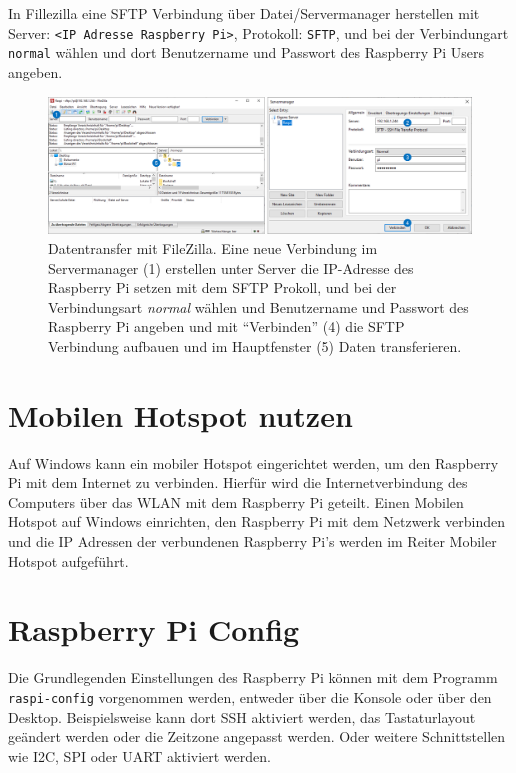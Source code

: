 \documentclass[
  11pt,
  a4paper,
  oneside, openany  ,captions=tableheading
]{scrbook}
\theoremstyle{remark}
\begin{document}
In Fillezilla eine SFTP Verbindung über Datei/Servermanager herstellen
mit Server:
\texttt{\textless{}IP\ Adresse\ Raspberry\ Pi\textgreater{}}, Protokoll:
\texttt{SFTP}, und bei der Verbindungart \texttt{normal} wählen und dort
Benutzername und Passwort des Raspberry Pi Users angeben.

\begin{figure}[H]

{\centering \includegraphics{images/raspberry_pi_filezilla.png}

}

\caption{Datentransfer mit FileZilla. Eine neue Verbindung im
Servermanager (1) erstellen unter Server die IP-Adresse des Raspberry Pi
setzen mit dem SFTP Prokoll, und bei der Verbindungsart \emph{normal}
wählen und Benutzername und Passwort des Raspberry Pi angeben und mit
``Verbinden'' (4) die SFTP Verbindung aufbauen und im Hauptfenster (5)
Daten transferieren.}

\end{figure}%

\section{Mobilen Hotspot nutzen}\label{mobilen-hotspot-nutzen}

Auf Windows kann ein mobiler Hotspot eingerichtet werden, um den
Raspberry Pi mit dem Internet zu verbinden. Hierfür wird die
Internetverbindung des Computers über das WLAN mit dem Raspberry Pi
geteilt. Einen Mobilen Hotspot auf Windows einrichten, den Raspberry Pi
mit dem Netzwerk verbinden und die IP Adressen der verbundenen Raspberry
Pi's werden im Reiter Mobiler Hotspot aufgeführt.

\section{Raspberry Pi Config}\label{raspberry-pi-config}

Die Grundlegenden Einstellungen des Raspberry Pi können mit dem Programm
\texttt{raspi-config} vorgenommen werden, entweder
über die Konsole oder über den Desktop. Beispielsweise kann dort SSH
aktiviert werden, das Tastaturlayout geändert werden oder die Zeitzone
angepasst werden. Oder weitere Schnittstellen wie I2C, SPI oder UART
aktiviert werden.
\end{document}
